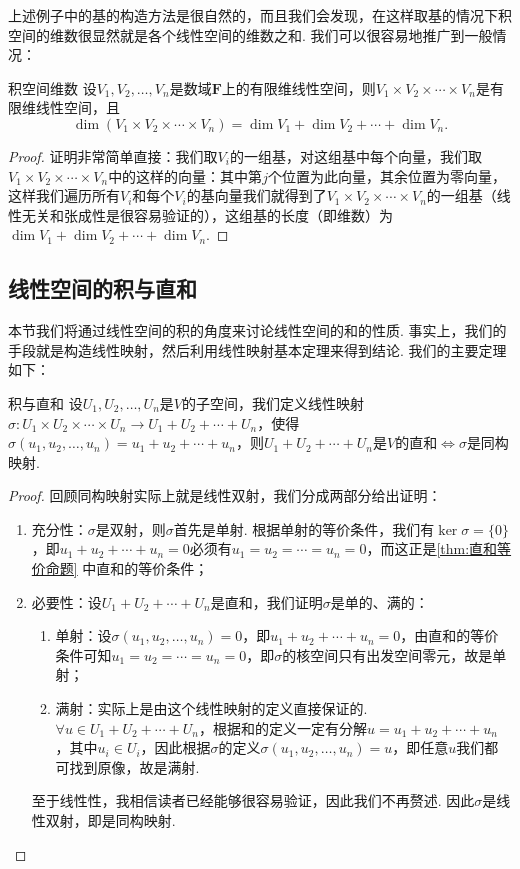 上述例子中的基的构造方法是很自然的，而且我们会发现，在这样取基的情况下积空间的维数很显然就是各个线性空间的维数之和. 我们可以很容易地推广到一般情况：
\begin{theorem}{}{积空间维数}
    设$V_1,V_2,\ldots,V_n$是数域$\mathbf{F}$上的有限维线性空间，则$V_1 \times V_2 \times \cdots \times V_n$是有限维线性空间，且
    \[\dim(V_1 \times V_2 \times \cdots \times V_n)=\dim V_1+\dim V_2+\cdots+\dim V_n.\]
\end{theorem}

\begin{proof}
    证明非常简单直接：我们取$V_i$的一组基，对这组基中每个向量，我们取$V_1 \times V_2 \times \cdots \times V_n$中的这样的向量：其中第$j$个位置为此向量，其余位置为零向量，这样我们遍历所有$V_i$和每个$V_i$的基向量我们就得到了$V_1 \times V_2 \times \cdots \times V_n$的一组基（线性无关和张成性是很容易验证的），这组基的长度（即维数）为$\dim V_1+\dim V_2+\cdots+\dim V_n$.
\end{proof}

\subsection{线性空间的积与直和}

本节我们将通过线性空间的积的角度来讨论线性空间的和的性质. 事实上，我们的手段就是构造线性映射，然后利用线性映射基本定理来得到结论. 我们的主要定理如下：
\begin{theorem}{}{积与直和}
    设$U_1,U_2,\ldots,U_n$是$V$的子空间，我们定义线性映射$\sigma:U_1 \times U_2 \times \cdots \times U_n \to U_1+U_2+\cdots+U_n$，使得$\sigma(u_1,u_2,\ldots,u_n)=u_1+u_2+\cdots+u_n$，则$U_1+U_2+\cdots+U_n$是$V$的直和$\iff \sigma$是同构映射.
\end{theorem}

\begin{proof}
    回顾同构映射实际上就是线性双射，我们分成两部分给出证明：
    \begin{enumerate}
        \item 充分性：$\sigma$是双射，则$\sigma$首先是单射. 根据单射的等价条件，我们有$\ker \sigma=\{0\}$，即$u_1+u_2+\cdots+u_n=0$必须有$u_1=u_2=\cdots=u_n=0$，而这正是\autoref{thm:直和等价命题} 中直和的等价条件；

        \item 必要性：设$U_1+U_2+\cdots+U_n$是直和，我们证明$\sigma$是单的、满的：
              \begin{enumerate}
                  \item 单射：设$\sigma(u_1,u_2,\ldots,u_n)=0$，即$u_1+u_2+\cdots+u_n=0$，由直和的等价条件可知$u_1=u_2=\cdots=u_n=0$，即$\sigma$的核空间只有出发空间零元，故是单射；

                  \item 满射：实际上是由这个线性映射的定义直接保证的. $\forall u \in U_1+U_2+\cdots+U_n$，根据和的定义一定有分解$u=u_1+u_2+\cdots+u_n$，其中$u_i \in U_i$，因此根据$\sigma$的定义$\sigma(u_1,u_2,\ldots,u_n)=u$，即任意$u$我们都可找到原像，故是满射.
              \end{enumerate}
              至于线性性，我相信读者已经能够很容易验证，因此我们不再赘述. 因此$\sigma$是线性双射，即是同构映射.
    \end{enumerate}
\end{proof}

